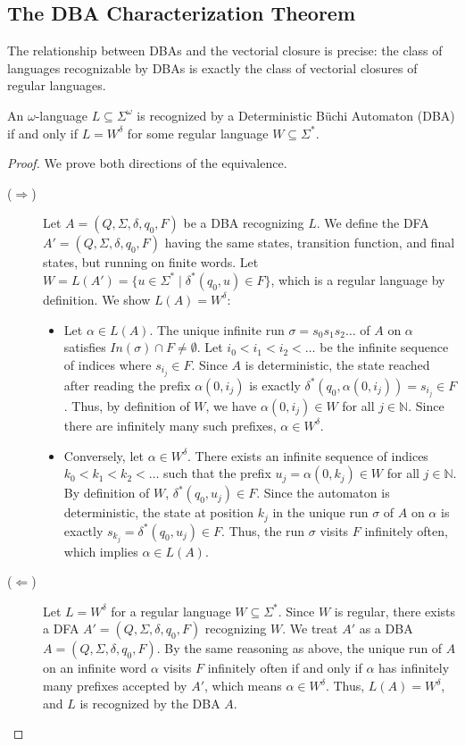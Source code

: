 \subsection{The DBA Characterization Theorem}
\label{subsec:dba-char}

The relationship between DBAs and the vectorial closure is precise: the class of languages recognizable by DBAs is exactly the class of vectorial closures of regular languages.

\begin{theorem}
An $\omega$-language $L \subseteq \Sigma^\omega$ is recognized by a Deterministic Büchi Automaton (DBA) if and only if $L = W^\delta$ for some regular language $W \subseteq \Sigma^*$.
\end{theorem}

\begin{proof}
We prove both directions of the equivalence.
\begin{description}
    \item[($\Longrightarrow$)] Let $A = (Q, \Sigma, \delta, q_0, F)$ be a DBA recognizing $L$. We define the DFA $A' = (Q, \Sigma, \delta, q_0, F)$ having the same states, transition function, and final states, but running on finite words. Let $W = L(A') = \{ u \in \Sigma^* \mid \delta^*(q_0, u) \in F \}$, which is a regular language by definition. We show $L(A) = W^\delta$:
    \begin{itemize}
        \item Let $\alpha \in L(A)$. The unique infinite run $\sigma = s_0 s_1 s_2 \dots$ of $A$ on $\alpha$ satisfies $In(\sigma) \cap F \neq \emptyset$. Let $i_0 < i_1 < i_2 < \dots$ be the infinite sequence of indices where $s_{i_j} \in F$. Since $A$ is deterministic, the state reached after reading the prefix $\alpha(0,i_j)$ is exactly $\delta^*(q_0, \alpha(0,i_j)) = s_{i_j} \in F$. Thus, by definition of $W$, we have $\alpha(0,i_j) \in W$ for all $j \in \mathbb{N}$. Since there are infinitely many such prefixes, $\alpha \in W^\delta$.
        \item Conversely, let $\alpha \in W^\delta$. There exists an infinite sequence of indices $k_0 < k_1 < k_2 < \dots$ such that the prefix $u_j = \alpha(0,k_j) \in W$ for all $j \in \mathbb{N}$. By definition of $W$, $\delta^*(q_0, u_j) \in F$. Since the automaton is deterministic, the state at position $k_j$ in the unique run $\sigma$ of $A$ on $\alpha$ is exactly $s_{k_j} = \delta^*(q_0, u_j) \in F$. Thus, the run $\sigma$ visits $F$ infinitely often, which implies $\alpha \in L(A)$.
    \end{itemize}
    \item[($\Longleftarrow$)] Let $L = W^\delta$ for a regular language $W \subseteq \Sigma^*$. Since $W$ is regular, there exists a DFA $A' = (Q, \Sigma, \delta, q_0, F)$ recognizing $W$. We treat $A'$ as a DBA $A = (Q, \Sigma, \delta, q_0, F)$. By the same reasoning as above, the unique run of $A$ on an infinite word $\alpha$ visits $F$ infinitely often if and only if $\alpha$ has infinitely many prefixes accepted by $A'$, which means $\alpha \in W^\delta$. Thus, $L(A) = W^\delta$, and $L$ is recognized by the DBA $A$.
\end{description}
\end{proof}

